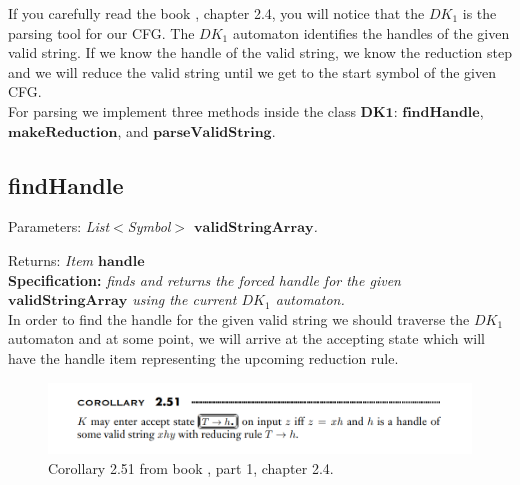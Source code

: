 If you carefully read the book \cite{sipser}, chapter 2.4, you will notice that the \(DK_{1}\) is the parsing tool for our CFG. The \(DK_{1}\) automaton identifies the handles of the given valid string. If we know the handle of the valid string, we know the reduction step and we will reduce the valid string until we get to the start symbol of the given CFG.\\

For parsing we implement three methods inside the class \(\boldsymbol{DK1}\):  \(\boldsymbol{findHandle}\), \(\boldsymbol{makeReduction}\), and \(\boldsymbol{parseValidString}\).

\vspace{10pt}

\subsection{findHandle}

Parameters: \textit{List\(<\)Symbol\(>\) \(\boldsymbol{validStringArray}\).}

Returns: \textit{Item \(\boldsymbol{handle}\)}\\

\textbf{Specification:} \textit{finds and returns the forced handle for the given \(\boldsymbol{validStringArray}\) using the current \(DK_{1}\) automaton.}\\

In order to find the handle for the given valid string we should traverse the \(DK_{1}\) automaton and at some point, we will arrive at the accepting state which will have the handle item representing the upcoming reduction rule.

\begin{figure}[h!]
    \includegraphics[width=\linewidth]{Identify Handle.png}
    \caption{Corollary 2.51 from book \cite{sipser}, part 1, chapter 2.4.}
    \label{figure 5}
\end{figure}

\vspace{10pt}

